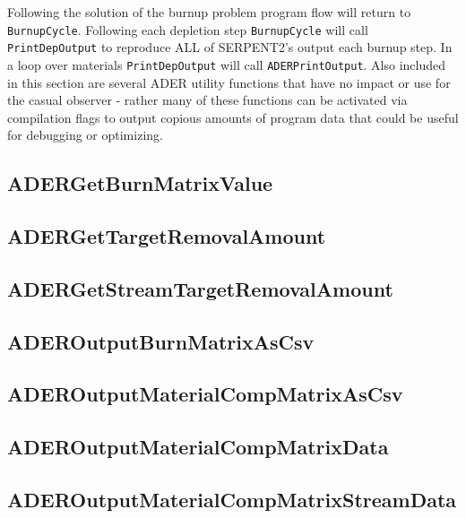 Following the solution of the burnup problem program flow will return to
\texttt{BurnupCycle}. Following each depletion step \texttt{BurnupCycle} will
call \texttt{PrintDepOutput} to reproduce ALL of SERPENT2's output each
burnup step. In a loop over materials \texttt{PrintDepOutput} will call
\texttt{ADERPrintOutput}. Also included in this section are several ADER
utility functions that have no impact or use for the casual observer - rather
many of these functions can be activated via compilation flags to output
copious amounts of program data that could be useful for debugging or
optimizing.

\subsection{ADERGetBurnMatrixValue}


\subsection{ADERGetTargetRemovalAmount}


\subsection{ADERGetStreamTargetRemovalAmount}


\subsection{ADEROutputBurnMatrixAsCsv}


\subsection{ADEROutputMaterialCompMatrixAsCsv}


\subsection{ADEROutputMaterialCompMatrixData}


\subsection{ADEROutputMaterialCompMatrixStreamData}


